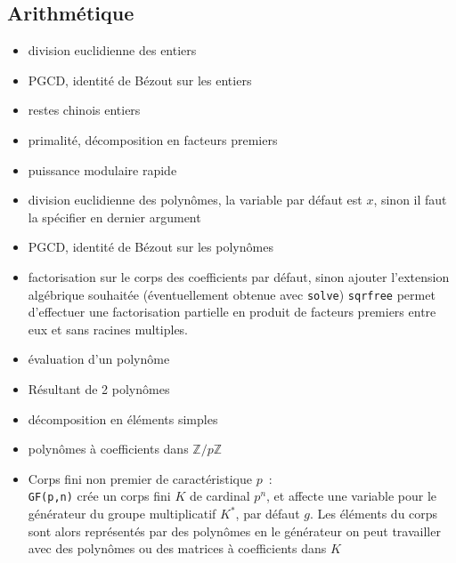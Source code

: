 \documentclass[a4paper,11pt]{book}
\begin{document}
\begin{giacjshere}
\subsection{Arithm\'etique}
\begin{itemize}
\item division euclidienne des entiers
\item PGCD, identit\'e de B\'ezout sur les entiers
\item restes chinois entiers
\item primalit\'e, d\'ecomposition en facteurs premiers
\item puissance modulaire rapide
\item division euclidienne des polyn\^omes, la variable par d\'efaut est $x$,
sinon il faut la sp\'ecifier en dernier argument
\item PGCD, identit\'e de B\'ezout sur les polyn\^omes
\item factorisation sur le corps des coefficients par d\'efaut, sinon 
ajouter l'extension alg\'ebrique souhait\'ee (\'eventuellement obtenue
avec \verb|solve|)
\verb|sqrfree| permet d'effectuer une factorisation partielle
en produit de facteurs premiers entre eux et sans racines multiples.
\item \'evaluation d'un polyn\^ome
\item R\'esultant de 2 polyn\^omes
\item d\'ecomposition en \'el\'ements simples
\item polyn\^omes \`a coefficients dans $\mathbb{Z}/p\mathbb{Z}$
\item Corps fini non premier de caract\'eristique $p$~:\\
\verb|GF(p,n)| cr\'ee un corps fini $K$ de cardinal $p^n$, 
et affecte une variable
pour le g\'en\'erateur du groupe multiplicatif $K^*$, par
d\'efaut $g$. Les \'el\'ements du corps sont alors repr\'esent\'es
par des polyn\^omes en le g\'en\'erateur
on peut travailler avec des polyn\^omes ou des matrices
\`a coefficients dans $K$
\end{itemize}


\end{giacjshere}
\end{document}
